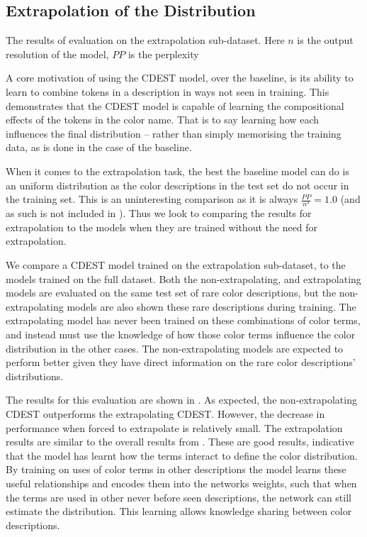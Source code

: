 \documentclass[11pt,a4paper]{article}
\begin{document}
\subsection{Extrapolation of the Distribution}

\begin{table}
	\centering
	\caption{\label{tblresextrapo} The results of evaluation on the extrapolation sub-dataset. Here $n$ is the output resolution of the model, $PP$ is the perplexity}
\end{table}


A core motivation of using the CDEST model, over the baseline, is its ability to learn to combine tokens in a description in ways not seen in training.
This demonstrates that the CDEST model is capable of learning the compositional effects of the tokens in the color name.
That is to say learning how each influences the final distribution -- rather than simply memorising the training data, as is done in the case of the baseline.

When it comes to the extrapolation task, the best the baseline model can do is an uniform distribution as the color descriptions in the test set do not occur in the training set.
This is an uninteresting comparison as it is always $\frac{PP}{n^3}=1.0$ (and as such is not included in ).
Thus we look to comparing the results for extrapolation to the models when they are trained without the need for extrapolation.

We compare a CDEST model trained on the extrapolation sub-dataset, to the models trained on the full dataset.
Both the non-extrapolating, and extrapolating models are evaluated on the same test set of rare color descriptions,
but the non-extrapolating models are also shown these rare descriptions during training.
The extrapolating model has never been trained on these combinations of color terms,
and instead must use the knowledge of how those color terms influence the color distribution in the other cases.
The non-extrapolating models are expected to perform better given they have direct information on the rare color descriptions' distributions.

The results for this evaluation are shown in .
As expected, the non-extrapolating CDEST outperforms the extrapolating CDEST.
However, the decrease in performance when forced to extrapolate is relatively small.
The extrapolation results are similar to the overall results from .
These are good results, indicative that the model has learnt how the terms interact to define the color distribution.
By training on uses of color terms in other descriptions the model learns these useful relationships and encodes them into the networks weights, such that when the terms are used in other never before seen descriptions, the network can still estimate the distribution.
This learning allows knowledge sharing between color descriptions.
\end{document}
